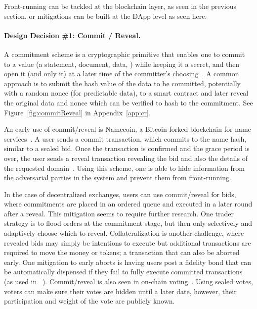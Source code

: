 Front-running can be tackled at the blockchain layer, as seen in the previous section, or mitigations can be built at the DApp level as seen here. 

\paragraph{Design Decision \#1: Commit / Reveal.} \label{CommitmentScheme}
A commitment scheme is a cryptographic primitive that enables one to commit to a value (\eg a statement, document, data, \etc) while keeping it a secret, and then open it (and only it) at a later time of the committer's choosing~\cite{brassard1988minimum}. A common approach is to submit the hash value of the data to be committed, potentially with a random nonce (for predictable data), to a smart contract and later reveal the original data and nonce which can be verified to hash to the commitment. See Figure~\ref{fig:commitReveal} in Appendix~\ref{app:cr}. 

An early use of commit/reveal is Namecoin, a Bitcoin-forked blockchain for name services~\cite{kalodner2015empirical}. A user sends a commit transaction, which commits to the name hash, similar to a sealed bid. Once the transaction is confirmed and the grace period is over, the user sends a reveal transaction revealing the bid and also the details of the requested domain~\cite{kalodner2015empirical}. Using this scheme, one is able to hide information from the adversarial parties in the system and prevent them from front-running. 

In the case of decentralized exchanges, users can use commit/reveal for bids, where commitments are placed in an ordered queue and executed in a later round after a reveal. This mitigation seems to require further research. One trader strategy is to flood orders at the commitment stage, but then only selectively and adaptively choose which to reveal. Collateralization is another challenge, where revealed bids may simply be intentions to execute but additional transactions are required to move the money or tokens; a transaction that can also be aborted early. One mitigation to early aborts is having users post a fidelity bond that can be automatically dispensed if they fail to fully execute committed transactions (as used in~\cite{} ). Commit/reveal is also seen in on-chain voting~\cite{adChainPLCRVoting}. Using sealed votes, voters can make sure their votes are hidden until a later date, however, their participation and weight of the vote are publicly known. 

